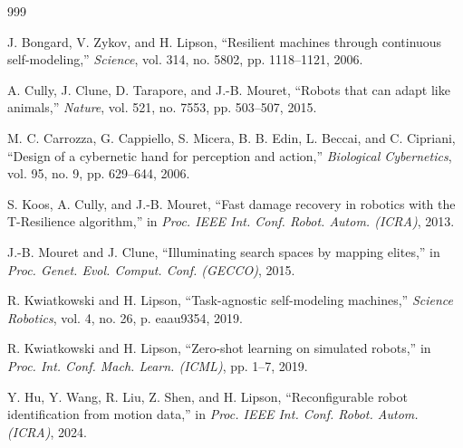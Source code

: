 \documentclass[12pt,a4paper,oneside]{report}
\begin{document}
\begin{thebibliography}{999}





J. Bongard, V. Zykov, and H. Lipson, ``Resilient machines through continuous self-modeling,'' \textit{Science}, vol. 314, no. 5802, pp. 1118--1121, 2006.




A. Cully, J. Clune, D. Tarapore, and J.-B. Mouret, ``Robots that can adapt like animals,'' \textit{Nature}, vol. 521, no. 7553, pp. 503--507, 2015.




M. C. Carrozza, G. Cappiello, S. Micera, B. B. Edin, L. Beccai, and C. Cipriani, ``Design of a cybernetic hand for perception and action,'' \textit{Biological Cybernetics}, vol. 95, no. 9, pp. 629--644, 2006.




S. Koos, A. Cully, and J.-B. Mouret, ``Fast damage recovery in robotics with the T-Resilience algorithm,'' in \textit{Proc. IEEE Int. Conf. Robot. Autom. (ICRA)}, 2013.




J.-B. Mouret and J. Clune, ``Illuminating search spaces by mapping elites,'' in \textit{Proc. Genet. Evol. Comput. Conf. (GECCO)}, 2015.




R. Kwiatkowski and H. Lipson, ``Task-agnostic self-modeling machines,'' \textit{Science Robotics}, vol. 4, no. 26, p. eaau9354, 2019.




R. Kwiatkowski and H. Lipson, ``Zero-shot learning on simulated robots,'' in \textit{Proc. Int. Conf. Mach. Learn. (ICML)}, pp. 1--7, 2019.




Y. Hu, Y. Wang, R. Liu, Z. Shen, and H. Lipson, ``Reconfigurable robot identification from motion data,'' in \textit{Proc. IEEE Int. Conf. Robot. Autom. (ICRA)}, 2024.




\end{thebibliography}
\end{document}
